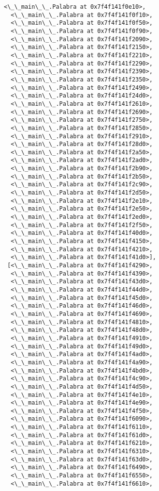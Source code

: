 \documentclass[12pt,a4paper,table]{article}
\begin{document}
\begin{tcolorbox}[breakable, size=fbox, boxrule=.5pt, pad at break*=1mm, opacityfill=0]
\begin{Verbatim}[commandchars=\\\{\}]
  <\_\_main\_\_.Palabra at 0x7f4f141f0e10>,
  <\_\_main\_\_.Palabra at 0x7f4f141f0f10>,
  <\_\_main\_\_.Palabra at 0x7f4f141f0f50>,
  <\_\_main\_\_.Palabra at 0x7f4f141f0f90>,
  <\_\_main\_\_.Palabra at 0x7f4f141f2090>,
  <\_\_main\_\_.Palabra at 0x7f4f141f2150>,
  <\_\_main\_\_.Palabra at 0x7f4f141f2210>,
  <\_\_main\_\_.Palabra at 0x7f4f141f2290>,
  <\_\_main\_\_.Palabra at 0x7f4f141f2390>,
  <\_\_main\_\_.Palabra at 0x7f4f141f2350>,
  <\_\_main\_\_.Palabra at 0x7f4f141f2490>,
  <\_\_main\_\_.Palabra at 0x7f4f141f24d0>,
  <\_\_main\_\_.Palabra at 0x7f4f141f2610>,
  <\_\_main\_\_.Palabra at 0x7f4f141f2690>,
  <\_\_main\_\_.Palabra at 0x7f4f141f2750>,
  <\_\_main\_\_.Palabra at 0x7f4f141f2850>,
  <\_\_main\_\_.Palabra at 0x7f4f141f2910>,
  <\_\_main\_\_.Palabra at 0x7f4f141f28d0>,
  <\_\_main\_\_.Palabra at 0x7f4f141f2a50>,
  <\_\_main\_\_.Palabra at 0x7f4f141f2ad0>,
  <\_\_main\_\_.Palabra at 0x7f4f141f2b90>,
  <\_\_main\_\_.Palabra at 0x7f4f141f2b50>,
  <\_\_main\_\_.Palabra at 0x7f4f141f2c90>,
  <\_\_main\_\_.Palabra at 0x7f4f141f2d50>,
  <\_\_main\_\_.Palabra at 0x7f4f141f2e10>,
  <\_\_main\_\_.Palabra at 0x7f4f141f2e50>,
  <\_\_main\_\_.Palabra at 0x7f4f141f2ed0>,
  <\_\_main\_\_.Palabra at 0x7f4f141f2f50>,
  <\_\_main\_\_.Palabra at 0x7f4f141f40d0>,
  <\_\_main\_\_.Palabra at 0x7f4f141f4150>,
  <\_\_main\_\_.Palabra at 0x7f4f141f4210>,
  <\_\_main\_\_.Palabra at 0x7f4f141f41d0>],
 [<\_\_main\_\_.Palabra at 0x7f4f141f4290>,
  <\_\_main\_\_.Palabra at 0x7f4f141f4390>,
  <\_\_main\_\_.Palabra at 0x7f4f141f43d0>,
  <\_\_main\_\_.Palabra at 0x7f4f141f44d0>,
  <\_\_main\_\_.Palabra at 0x7f4f141f45d0>,
  <\_\_main\_\_.Palabra at 0x7f4f141f46d0>,
  <\_\_main\_\_.Palabra at 0x7f4f141f4690>,
  <\_\_main\_\_.Palabra at 0x7f4f141f4810>,
  <\_\_main\_\_.Palabra at 0x7f4f141f48d0>,
  <\_\_main\_\_.Palabra at 0x7f4f141f4910>,
  <\_\_main\_\_.Palabra at 0x7f4f141f49d0>,
  <\_\_main\_\_.Palabra at 0x7f4f141f4ad0>,
  <\_\_main\_\_.Palabra at 0x7f4f141f4a90>,
  <\_\_main\_\_.Palabra at 0x7f4f141f4bd0>,
  <\_\_main\_\_.Palabra at 0x7f4f141f4c90>,
  <\_\_main\_\_.Palabra at 0x7f4f141f4d50>,
  <\_\_main\_\_.Palabra at 0x7f4f141f4e10>,
  <\_\_main\_\_.Palabra at 0x7f4f141f4e90>,
  <\_\_main\_\_.Palabra at 0x7f4f141f4f50>,
  <\_\_main\_\_.Palabra at 0x7f4f141f6090>,
  <\_\_main\_\_.Palabra at 0x7f4f141f6110>,
  <\_\_main\_\_.Palabra at 0x7f4f141f61d0>,
  <\_\_main\_\_.Palabra at 0x7f4f141f6210>,
  <\_\_main\_\_.Palabra at 0x7f4f141f6310>,
  <\_\_main\_\_.Palabra at 0x7f4f141f63d0>,
  <\_\_main\_\_.Palabra at 0x7f4f141f6490>,
  <\_\_main\_\_.Palabra at 0x7f4f141f6550>,
  <\_\_main\_\_.Palabra at 0x7f4f141f6610>,

\end{Verbatim}
\end{tcolorbox}
\end{document}
